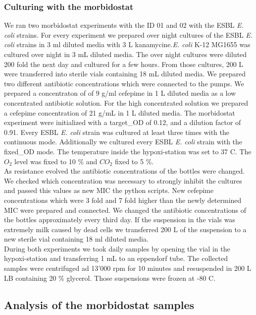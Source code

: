 \subsubsection{Culturing with the morbidostat}
We ran two morbidostat experiments with the ID 01 and 02 with the ESBL \textit{E. coli} strains. For every experiment we prepared over night cultures of the ESBL \textit{E. coli} strains in 3 ml diluted media with 3 \textmu L kanamycine.\textit{E. coli} K-12 MG1655 was cultured over night in 3 mL diluted media. The over night cultures were diluted 200 fold the next day and cultured for a few hours. From those cultures, 200 \textmu L were transferred into sterile vials containing 18 mL diluted media. We prepared two different antibiotic concentrations which were connected to the pumps. We prepared a concentraton of of 9 \textmu g/ml cefepime in 1 L diluted media as a low concentrated antibiotic solution. For the high concentrated solution we prepared a cefepime concentration of 21 \textmu g/mL in 1 L diluted media. The morbidostat experiment were initialized with a target\_OD of 0.12, and a dilution factor of 0.91. Every ESBL \textit{E. coli} strain was cultured at least three times with the continuous mode. Additionally we cultured every ESBL \textit{E. coli} strain with the fixed\_OD mode. The temperature inside the hypoxi-station was set to 37 \degree C. The $O_2$ level was fixed to 10 \% and $CO_2$ fixed to 5 \%. \\
As resistance evolved the antibiotic concentrations of the bottles were changed. We checked which concentration was necessary to strongly inhibit the cultures and passed this values as new MIC the python scripts. New cefepime concentrations which were 3 fold and 7 fold higher than the newly determined MIC were prepared and connected. We changed the antibiotic concentrations of the bottles approximately every third day. If the suspension in the vials was extremely milk caused by dead cells we transferred 200 \textmu L of the suspension to a new sterile vial containing 18 ml diluted media.  \\
During both experiments we took daily samples by opening the vial in the hypoxi-station and transferring 1 mL to an eppendorf tube. The collected samples were centrifuged ad 13'000 rpm for 10 minutes and resuspended in 200 \textmu L LB containing 20 \% glycerol. Those suspensions were frozen at -80 \degree C.\\

\subsection{Analysis of the morbidostat samples}
